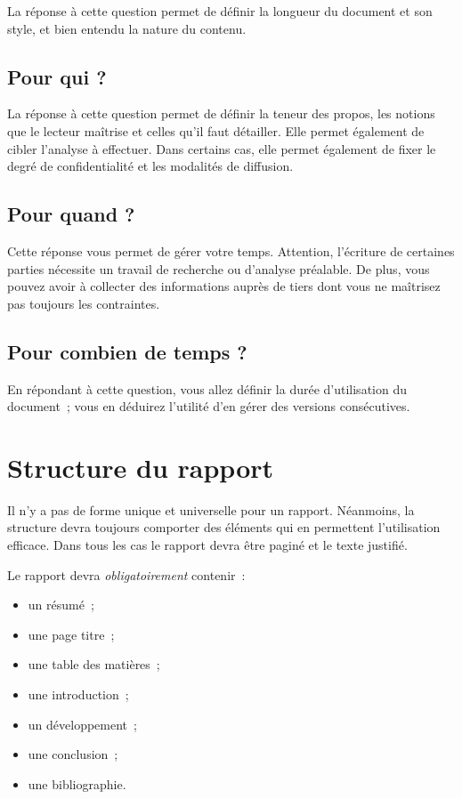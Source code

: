 La réponse à cette question permet de définir la longueur du
document et son style, et bien entendu la nature du contenu.

\subsection*{Pour qui ?}

La réponse à cette question permet de définir la teneur des propos, les
notions que le lecteur maîtrise et celles qu'il faut détailler. Elle permet
également de cibler l'analyse à effectuer. Dans certains cas, elle permet
également de fixer le degré de confidentialité et
les modalités de diffusion.

\subsection*{Pour quand ?}

Cette réponse vous permet de gérer votre temps. Attention, l'écriture de
certaines parties nécessite un travail de recherche ou d'analyse préalable. De
plus, vous 
pouvez avoir à collecter des informations auprès de tiers dont vous ne
maîtrisez pas toujours les contraintes.

\subsection*{Pour combien de temps ?}

En répondant à cette question, vous allez définir la durée
d'utilisation du document~; vous en déduirez l'utilité d'en gérer des versions
consécutives.


\section{Structure du rapport}
\label{sec:struct}

Il n'y a pas de forme unique et universelle pour un rapport.
Néanmoins, la structure devra toujours comporter des éléments qui en
permettent l'utilisation efficace.
Dans tous les cas le rapport devra être paginé et le texte justifié.

 Le rapport devra \emph{obligatoirement} contenir~:
 \begin{itemize}
 \item un résumé~; 
 \item une page titre~;
 \item une table des matières~;
 \item une introduction~;
 \item un développement~; 
 \item une conclusion~;
\item une bibliographie.
 \end{itemize}

